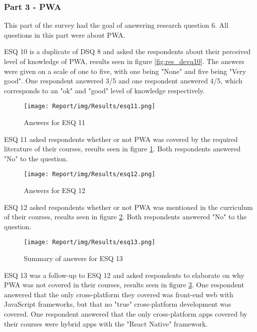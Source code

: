 \documentclass[a4paper,12pt]{article}
\begin{document}
\subsubsection{Part 3 - PWA}
This part of the survey had the goal of answering research question 6. All questions in this part were about PWA.

ESQ 10 is a duplicate of DSQ 8 and asked the respondents about their perceived level of knowledge of PWA, results seen in figure \ref{fig:res_devq10}. The answers were given on a scale of one to five, with one being "None" and five being "Very good". One respondent answered 3/5 and one respondent answered 4/5, which corresponds to an "ok" and "good" level of knowledge respectively.

\begin{figure}[ht!]
    \centering
    \texttt{[image: Report/img/Results/esq11.png]}
    \caption{Answers for ESQ 11}
    \label{fig:res_eduq11}
\end{figure}

ESQ 11 asked respondents whether or not PWA was covered by the required literature of their courses, results seen in figure \ref{fig:res_eduq11}. Both respondents answered "No" to the question.

\begin{figure}[ht!]
    \centering
    \texttt{[image: Report/img/Results/esq12.png]}
    \caption{Answers for ESQ 12}
    \label{fig:res_eduq12}
\end{figure}

ESQ 12 asked respondents whether or not PWA was mentioned in the curriculum of their courses, results seen in figure \ref{fig:res_eduq12}. Both respondents answered "No" to the question.

\begin{figure}[ht!]
    \centering
    \texttt{[image: Report/img/Results/esq13.png]}
    \caption{Summary of answers for ESQ 13}
    \label{fig:res_eduq13}
\end{figure}

\newpage ESQ 13 was a follow-up to ESQ 12 and asked respondents to elaborate on why PWA was not covered in their courses, results seen in figure \ref{fig:res_eduq13}. One respondent answered that the only cross-platform they covered was front-end web with JavaScript frameworks, but that no "true" cross-platform development was covered. One respondent answered that the only cross-platform apps covered by their courses were hybrid apps with the "React Native" framework.
\end{document}
